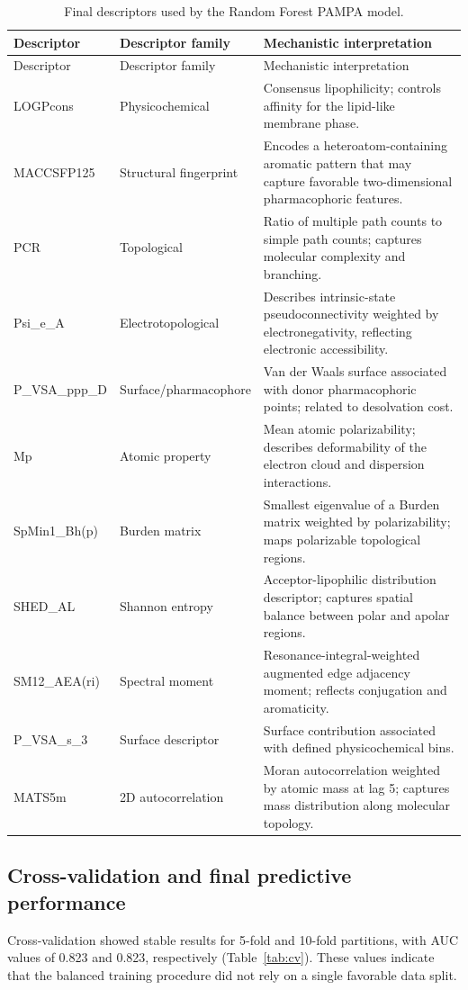 \documentclass[11pt]{article}
\begin{document}
\begin{longtable}{p{}p{}p{}}
\caption{Final descriptors used by the Random Forest PAMPA model.}
\label{tab:descriptors}\\
\toprule
Descriptor & Descriptor family & Mechanistic interpretation \\
\midrule
\endfirsthead
\toprule
Descriptor & Descriptor family & Mechanistic interpretation \\
\midrule
\endhead
LOGPcons & Physicochemical & Consensus lipophilicity; controls affinity for the lipid-like membrane phase. \\
MACCSFP125 & Structural fingerprint & Encodes a heteroatom-containing aromatic pattern that may capture favorable two-dimensional pharmacophoric features. \\
PCR & Topological & Ratio of multiple path counts to simple path counts; captures molecular complexity and branching. \\
Psi\_e\_A & Electrotopological & Describes intrinsic-state pseudoconnectivity weighted by electronegativity, reflecting electronic accessibility. \\
P\_VSA\_ppp\_D & Surface/pharmacophore & Van der Waals surface associated with donor pharmacophoric points; related to desolvation cost. \\
Mp & Atomic property & Mean atomic polarizability; describes deformability of the electron cloud and dispersion interactions. \\
SpMin1\_Bh(p) & Burden matrix & Smallest eigenvalue of a Burden matrix weighted by polarizability; maps polarizable topological regions. \\
SHED\_AL & Shannon entropy & Acceptor-lipophilic distribution descriptor; captures spatial balance between polar and apolar regions. \\
SM12\_AEA(ri) & Spectral moment & Resonance-integral-weighted augmented edge adjacency moment; reflects conjugation and aromaticity. \\
P\_VSA\_s\_3 & Surface descriptor & Surface contribution associated with defined physicochemical bins. \\
MATS5m & 2D autocorrelation & Moran autocorrelation weighted by atomic mass at lag 5; captures mass distribution along molecular topology. \\
\bottomrule
\end{longtable}

\subsection{Cross-validation and final predictive performance}
Cross-validation showed stable results for 5-fold and 10-fold partitions, with AUC values of 0.823 and 0.823, respectively (Table~\ref{tab:cv}). These values indicate that the balanced training procedure did not rely on a single favorable data split.
\end{document}
